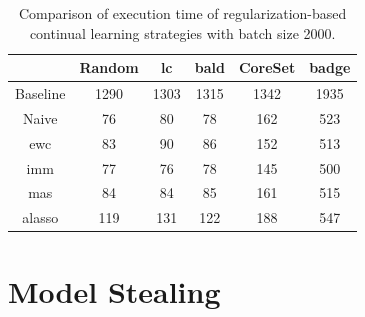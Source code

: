 
\begin{table}[h]
    \centering
    \begin{tabular}{c | c c c c c } 
         & Random & \gls{lc} & \gls{bald} & CoreSet & \gls{badge}\\ 
        \hline 
        Baseline & 1290 & 1303 & 1315 & 1342 & 1935 \\
        \hline
        Naive & 76 & 80 & 78 & 162 & 523 \\
        \gls{ewc} & 83 & 90 & 86 & 152 & 513\\
        \gls{imm} & 77 & 76 & 78 & 145 & 500\\
        \gls{mas} & 84 & 84 & 85 & 161 & 515\\
        \gls{alasso} & 119 & 131 & 122 & 188 & 547\\
    \end{tabular}
    \caption{Comparison of execution time of regularization-based continual learning strategies
    with batch size 2000.}
    \label{fig:Evaluation:Results:CAL:2000bTimeTable}
\end{table}

\section{Model Stealing}
\label{sec:Appendix:MS}


